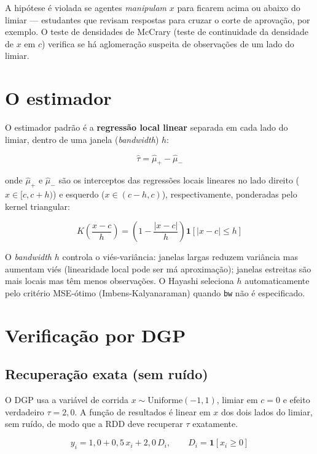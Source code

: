 A hipótese é violada se agentes \emph{manipulam} $x$ para ficarem acima ou
abaixo do limiar — estudantes que revisam respostas para cruzar o corte de
aprovação, por exemplo. O teste de densidades de McCrary (teste de
continuidade da densidade de $x$ em $c$) verifica se há aglomeração
suspeita de observações de um lado do limiar.

\section{O estimador}

O estimador padrão é a \textbf{regressão local linear} separada em cada
lado do limiar, dentro de uma janela (\emph{bandwidth}) $h$:

\[
  \hat\tau = \hat\mu_+ - \hat\mu_-
\]

onde $\hat\mu_+$ e $\hat\mu_-$ são os interceptos das regressões locais
lineares no lado direito ($x \in [c, c+h)$) e esquerdo ($x \in (c-h, c)$),
respectivamente, ponderadas pelo kernel triangular:

\[
  K\!\left(\frac{x - c}{h}\right) = \left(1 - \frac{|x-c|}{h}\right)
  \mathbf{1}[|x-c| \leq h]
\]

O \emph{bandwidth} $h$ controla o viés-variância: janelas largas reduzem
variância mas aumentam viés (linearidade local pode ser má aproximação);
janelas estreitas são mais locais mas têm menos observações. O Hayashi
seleciona $h$ automaticamente pelo critério MSE-ótimo (Imbens-Kalyanaraman)
quando \lstinline{bw} não é especificado.

\section{Verificação por DGP}

\subsection*{Recuperação exata (sem ruído)}

O DGP usa a variável de corrida $x \sim \mathrm{Uniforme}(-1, 1)$, limiar em
$c = 0$ e efeito verdadeiro $\tau = 2{,}0$. A função de resultados é linear
em $x$ dos dois lados do limiar, sem ruído, de modo que a RDD deve recuperar
$\tau$ exatamente.

\[
  y_i = 1{,}0 + 0{,}5\,x_i + 2{,}0\,D_i, \qquad D_i = \mathbf{1}[x_i \geq 0]
\]

